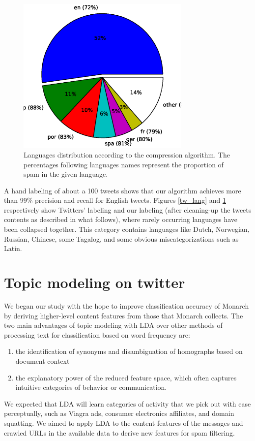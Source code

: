 \documentclass[times, 11pt, twocolumn]{article}
\begin{document}
\begin{figure}[!h]\centering
	\includegraphics[width=8.5cm]{lang_infered.eps}
	\caption{Languages distribution according to the compression algorithm. The percentages following languages names 
		represent the proportion of spam in the given language.}
	\label{inf_lang}
\end{figure}

A hand labeling of about a 100 tweets shows that our algorithm achieves more than 99\% precision and recall for English tweets. Figures
\ref{tw_lang} and \ref{inf_lang} respectively show Twitters' labeling and our labeling (after cleaning-up the tweets contents 
as described in what follows), where rarely occurring languages have been collapsed
together. This category contains languages like Dutch, Norwegian, Russian, Chinese, some Tagalog, and some 
obvious miscategorizations such as Latin.

\section{Topic modeling on twitter}

We began our study with the hope to improve classification accuracy of Monarch by deriving higher-level content features from those that Monarch collects.
The two main advantages of topic modeling with LDA over other methods of processing text for classification based on word frequency are:
\begin{enumerate}
\item the identification of synonyms and disambiguation of homographs based on document context
\item the explanatory power of the reduced feature space, which often captures intuitive categories of behavior or communication. 
\end{enumerate}
We expected that LDA will learn categories of activity that we pick out with ease perceptually, such as Viagra ads, consumer electronics affiliates, and domain squatting.
We aimed to apply LDA to the content features of the messages and crawled URLs in the available data to derive new features for spam filtering.
\end{document}
